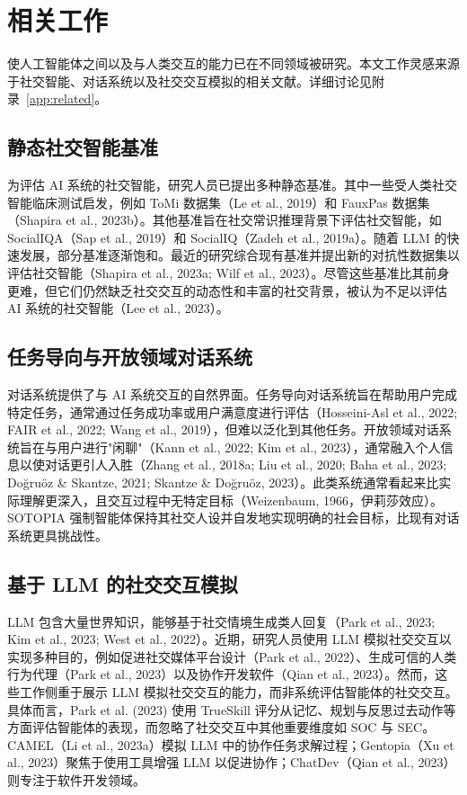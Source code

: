 \documentclass[11pt,a4paper]{article}
\begin{document}
\section{相关工作}

使人工智能体之间以及与人类交互的能力已在不同领域被研究。本文工作灵感来源于社交智能、对话系统以及社交交互模拟的相关文献。详细讨论见附录~\ref{app:related}。

\subsection*{静态社交智能基准}

为评估 AI 系统的社交智能，研究人员已提出多种静态基准。其中一些受人类社交智能临床测试启发，例如 ToMi 数据集（Le et al., 2019）和 FauxPas 数据集（Shapira et al., 2023b）。其他基准旨在社交常识推理背景下评估社交智能，如 SocialIQA（Sap et al., 2019）和 SocialIQ（Zadeh et al., 2019a）。随着 LLM 的快速发展，部分基准逐渐饱和。最近的研究综合现有基准并提出新的对抗性数据集以评估社交智能（Shapira et al., 2023a; Wilf et al., 2023）。尽管这些基准比其前身更难，但它们仍然缺乏社交交互的动态性和丰富的社交背景，被认为不足以评估 AI 系统的社交智能（Lee et al., 2023）。

\subsection*{任务导向与开放领域对话系统}

对话系统提供了与 AI 系统交互的自然界面。任务导向对话系统旨在帮助用户完成特定任务，通常通过任务成功率或用户满意度进行评估（Hosseini-Asl et al., 2022; FAIR et al., 2022; Wang et al., 2019），但难以泛化到其他任务。开放领域对话系统旨在与用户进行"闲聊"（Kann et al., 2022; Kim et al., 2023），通常融入个人信息以使对话更引人入胜（Zhang et al., 2018a; Liu et al., 2020; Baha et al., 2023; Doğruöz \& Skantze, 2021; Skantze \& Doğruöz, 2023）。此类系统通常看起来比实际理解更深入，且交互过程中无特定目标（Weizenbaum, 1966，伊莉莎效应）。SOTOPIA 强制智能体保持其社交人设并自发地实现明确的社会目标，比现有对话系统更具挑战性。

\subsection*{基于 LLM 的社交交互模拟}

LLM 包含大量世界知识，能够基于社交情境生成类人回复（Park et al., 2023; Kim et al., 2023; West et al., 2022）。近期，研究人员使用 LLM 模拟社交交互以实现多种目的，例如促进社交媒体平台设计（Park et al., 2022）、生成可信的人类行为代理（Park et al., 2023）以及协作开发软件（Qian et al., 2023）。然而，这些工作侧重于展示 LLM 模拟社交交互的能力，而非系统评估智能体的社交交互。具体而言，Park et al. (2023) 使用 TrueSkill 评分从记忆、规划与反思过去动作等方面评估智能体的表现，而忽略了社交交互中其他重要维度如 SOC 与 SEC。CAMEL（Li et al., 2023a）模拟 LLM 中的协作任务求解过程；Gentopia（Xu et al., 2023）聚焦于使用工具增强 LLM 以促进协作；ChatDev（Qian et al., 2023）则专注于软件开发领域。
\end{document}

